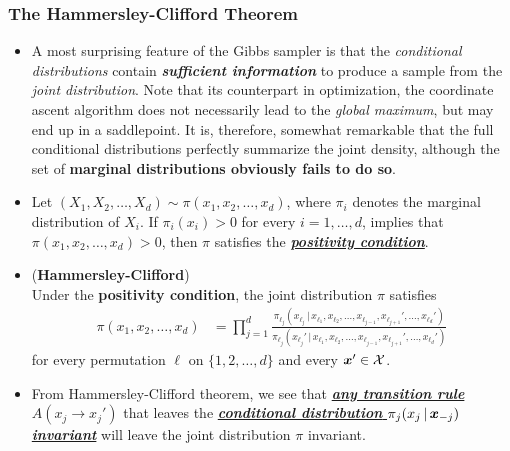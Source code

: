 \documentclass[11pt]{article}
\begin{document}
\subsubsection{The Hammersley-Clifford Theorem}
\begin{itemize}
\item A most surprising feature of the Gibbs sampler is that the \emph{conditional distributions} contain \emph{\textbf{sufficient information}} to produce a sample from the \emph{joint distribution}. Note that its counterpart in optimization, the coordinate ascent algorithm does not necessarily lead to the \emph{global maximum}, but may end up in a saddlepoint. It is, therefore, somewhat remarkable that the full conditional distributions perfectly summarize the joint density, although the set of \textbf{marginal distributions obviously fails to do so}.

\item \begin{definition}
Let $(X_1, X_2, \ldots, X_d) \sim \pi(x_1, x_2, \ldots, x_d)$, where $\pi_i$ denotes the marginal distribution of $X_i$. If $\pi_i(x_i) > 0$ for every $i = 1, \ldots, d$, implies that $\pi(x_1, x_2, \ldots, x_d) > 0$, then $\pi$ satisfies the \underline{\emph{\textbf{positivity condition}}}.
\end{definition}

\item \begin{theorem} (\textbf{Hammersley-Clifford})\\
Under the \textbf{positivity condition}, the joint distribution $\pi$ satisfies 
\begin{align}
\pi(x_1, x_2, \ldots, x_d) &= \prod_{j=1}^{d}\frac{\pi_{\ell_{j}}(x_{\ell_j}\,|\, x_{\ell_1}, x_{\ell_2}, \ldots, x_{\ell_{j-1}}, x_{\ell_{j+1}}', \ldots, x_{\ell_{d}}') }{\pi_{\ell_{j}}(x_{\ell_j}'\,|\, x_{\ell_1}, x_{\ell_2}, \ldots, x_{\ell_{j-1}}, x_{\ell_{j+1}}', \ldots, x_{\ell_{d}}') } \label{eqn: hammersley_clifford}
\end{align}
for every permutation $\ell$ on $\{1, 2, \ldots ,d\}$ and every $\boldsymbol{x}' \in {\mathcal X}$.
\end{theorem}

\item From Hammersley-Clifford theorem, we see that \underline{\emph{\textbf{any transition rule}}} $A(x_{j} \rightarrow x_{j}')$ that leaves the \underline{\emph{\textbf{conditional distribution}} $\pi_{j}(x_j \,|\,\boldsymbol{x}_{-j})$ \emph{\textbf{invariant}}} will leave the joint distribution $\pi$ invariant.
\end{itemize}
\end{document}
